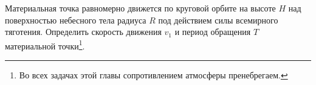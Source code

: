 Материальная точка равномерно движется по круговой орбите на высоте $H$
над поверхностью небесного тела радиуса $R$
под действием силы всемирного тяготения.
Определить скорость движения $v_1$ и период обращения $T$ материальной
точки\footnote{
Во всех задачах этой главы сопротивлением атмосферы пренебрегаем.}.
